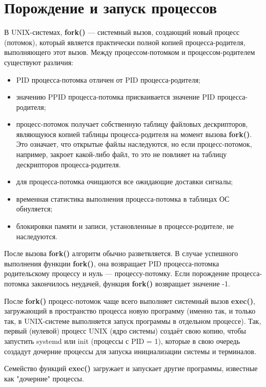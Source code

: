 \documentclass[a4paper]{article}
\begin{document}
\section{Порождение и запуск процессов}
	В UNIX-системах, \textbf{fork()} --- системный вызов, создающий новый процесс (потомок), который является практически полной копией процесса-родителя, выполняющего этот вызов. Между процессом-потомком и процессом-родителем существуют различия:
	\begin{itemize}
		\item PID процесса-потомка отличен от PID процесса-родителя;
		\item значению PPID процесса-потомка присваивается значение PID процесса-родителя;
		\item процесс-потомок получает собственную таблицу файловых дескрипторов, являющуюся копией таблицы процесса-родителя на момент вызова \textbf{fork()}. Это означает, что открытые файлы наследуются, но если процесс-потомок, например, закроет какой-либо файл, то это не повлияет на таблицу дескрипторов процесса-родителя.
		\item для процесса-потомка очищаются все ожидающие доставки сигналы;
		\item временная статистика выполнения процесса-потомка в таблицах ОС обнуляется;
		\item блокировки памяти и записи, установленные в процессе-родителе, не наследуются.	
	\end{itemize}
	
	После вызова \textbf{fork()} алгоритм обычно разветвляется. В случае успешного выполнения функции \textbf{fork()}, она возвращает PID процесса-потомка родительскому процессу и нуль --- процессу-потомку. Если порождение процесса-потомка закончилось неудачей, функция \textbf{fork()} возвращает значение -1.
	
	После \textbf{fork()} процесс-потомок чаще всего выполняет системный вызов \textbf{exec()}, загружающий в пространство процесса новую программу (именно так, и только так, в UNIX-системе выполняется запуск программы в отдельном процессе). Так, первый (нулевой) процесс UNIX (ядро системы) создаёт свою копию, чтобы запустить systemd или init (процессы с PID = 1), которые в свою очередь создадут дочерние процессы для запуска инициализации системы и терминалов.
	
	Семейство функций \textbf{exec()} загружает  и  запускает другие    программы, известные как "дочерние" процессы. 
	
	
\end{document}
